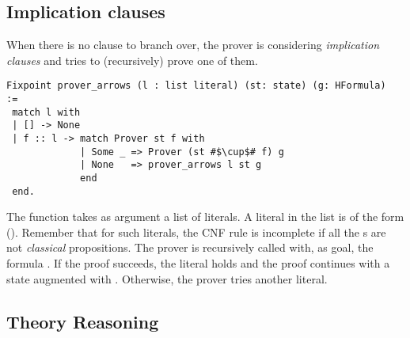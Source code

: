 \documentclass[a4paper,UKenglish,cleveref, autoref, thm-restate]{lipics-v2019}
\begin{document}
\subsection{Implication clauses}
When there is no clause to branch over, the prover is considering 
\emph{implication clauses} and tries to (recursively) prove one of
them.
\begin{verbatim}
Fixpoint prover_arrows (l : list literal) (st: state) (g: HFormula)  :=
 match l with
 | [] -> None
 | f :: l -> match Prover st f with
             | Some _ => Prover (st #$\cup$# f) g
             | None   => prover_arrows l st g
             end
 end.
\end{verbatim}
The function  takes as argument a list  of
literals.  A literal  in the list is of the form 
().
%
Remember that for such literals, the CNF rule  is incomplete if all the s are not \emph{classical} propositions.
%
The prover is recursively called with, as goal,
the formula . If the proof succeeds, the literal  holds
and the proof continues with a state augmented with .
Otherwise, the prover tries another literal.
%

\subsection{Theory Reasoning}
\label{sec:thy-reasoning}
\end{document}
